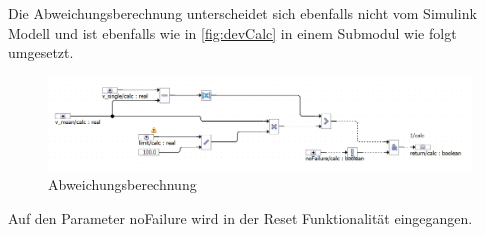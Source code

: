 Die Abweichungsberechnung unterscheidet sich ebenfalls nicht vom Simulink Modell und ist ebenfalls wie in \autoref{fig:devCalc} in einem Submodul wie folgt umgesetzt.
\begin{figure}[H]
	\centering
	\includegraphics[width=\linewidth]{../Graphiken/devCalc}
	\caption{Abweichungsberechnung}
	\label{fig:devCalc}
\end{figure}
Auf den Parameter noFailure wird in der Reset Funktionalität eingegangen.






